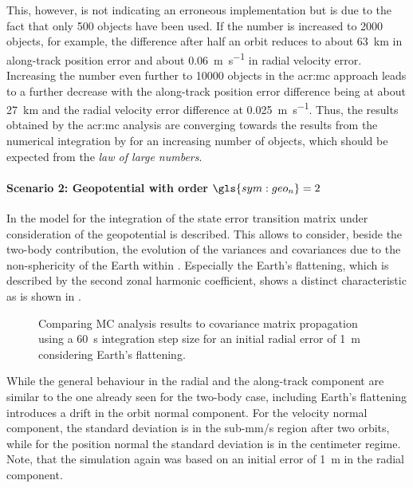 This, however, is not indicating an erroneous implementation but is due to the fact that only 500 objects have been used. If the number is increased to 2000 objects, for example, the difference after half an orbit reduces to about \SI{63}{\kilo\metre} in along-track position error and about \SI{0.06}{\metre\per\second} in radial velocity error. 
Increasing the number even further to \num{10000} objects in the \gls{acr:mc} approach leads to a further decrease with the along-track position error difference 
being at about \SI{27}{\kilo\metre} and the radial velocity error difference at \SI{0.025}{\metre\per\second}. Thus, the results obtained by the \gls{acr:mc} analysis are converging towards the 
results from the numerical integration by \neptune{} for an increasing number of objects, which should be expected from the \textit{law of large numbers}.

\paragraph{Scenario 2: Geopotential with order $\gls{sym:geo_n}=2$}

In  the model for the integration of the state error transition matrix under consideration of the 
geopotential is described. This allows to consider, beside the two-body contribution, the evolution of the variances and covariances due to the non-sphericity 
of the Earth within \neptune{}. Especially the Earth's flattening, which is described by the second zonal harmonic coefficient, shows a distinct characteristic 
as is shown in .
\begin{figure}[h!]
  \centering
  \hspace{1cm}
  \caption{Comparing MC analysis results to \neptune{} covariance matrix propagation using a \SI{60}{\second} integration step size for an initial radial error of \SI{1}{\metre} considering Earth's flattening. \label{fig:val-cov-scen2-01}}
\end{figure}
While the general behaviour in the radial and the along-track component are similar to the one already seen for the two-body case, including Earth's flattening introduces a drift in the orbit normal component. For the velocity normal component, the standard deviation is in the sub-mm/s region after two orbits, while for the position normal the standard deviation is in the centimeter regime. Note, that the simulation again was based on an initial error of \SI{1}{\metre} in the 
radial component.

